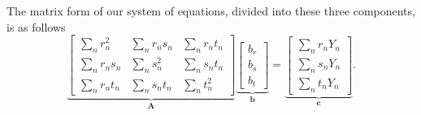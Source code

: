 \documentclass[
  12pt,
  oneside,openany]{book}
\begin{document}
The matrix form of our system of equations, divided into these three components, is as follows
\[
\underbrace{\begin{bmatrix}
\sum_n r_n^2 & \sum_n r_n s_n & \sum_n r_n t_n \\
\sum_n r_n s_n & \sum_n s_n^2 & \sum_n s_n t_n \\
\sum_n r_n t_n & \sum_n s_n t_n & \sum_n t_n^2
\end{bmatrix}}_{\mathbf{A}}
\underbrace{\begin{bmatrix}
b_r \\ b_s \\ b_t
\end{bmatrix}}_{\mathbf{b}}
=
\underbrace{\begin{bmatrix}
\sum_n r_n Y_n \\ \sum_n s_n Y_n \\ \sum_n t_n Y_n
\end{bmatrix}}_{\mathbf{c}}.
\]
\end{document}
